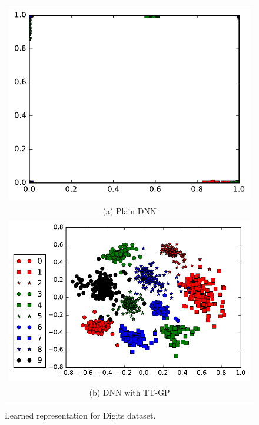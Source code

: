 \begin{figure}[!t]
  \begin{center}
      \begin{tabular}{c}
        \hspace{1.cm}\includegraphics[height=0.6\linewidth]{pics/embedding_dnn.pdf}\\
           (a) Plain DNN\\
          \includegraphics[height=0.6\linewidth]{pics/embedding_ttgp.pdf} \\
          (b) DNN with TT-GP \\
      \end{tabular}
  \end{center}
  \caption{Learned representation for Digits dataset.}
  \label{digits_embedding}
\end{figure}

